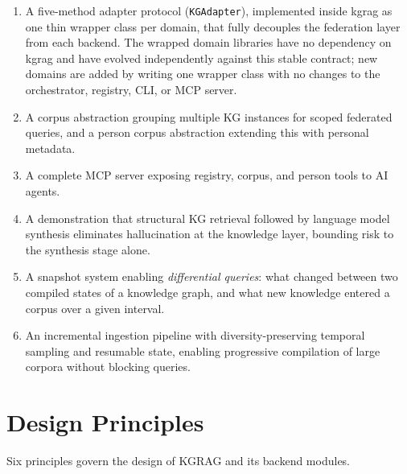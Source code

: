 \documentclass[10pt]{article}
\begin{document}
\begin{enumerate}
  \item A five-method adapter protocol (\texttt{KGAdapter}), implemented
    inside kgrag as one thin wrapper class per domain, that fully decouples
    the federation layer from each backend. The wrapped domain libraries
    have no dependency on kgrag and have evolved independently against this
    stable contract; new domains are added by writing one wrapper class with
    no changes to the orchestrator, registry, CLI, or MCP server.
  \item A corpus abstraction grouping multiple KG instances for scoped federated
    queries, and a person corpus abstraction extending this with personal metadata.
  \item A complete MCP server exposing registry, corpus, and person tools to
    AI agents.
  \item A demonstration that structural KG retrieval followed by language model
    synthesis eliminates hallucination at the knowledge layer, bounding risk to
    the synthesis stage alone.
  \item A snapshot system enabling \emph{differential queries}: what changed
    between two compiled states of a knowledge graph, and what new knowledge
    entered a corpus over a given interval.
  \item An incremental ingestion pipeline with diversity-preserving temporal
    sampling and resumable state, enabling progressive compilation of large
    corpora without blocking queries.
\end{enumerate}

\section{Design Principles}

Six principles govern the design of KGRAG and its backend modules.
\end{document}
